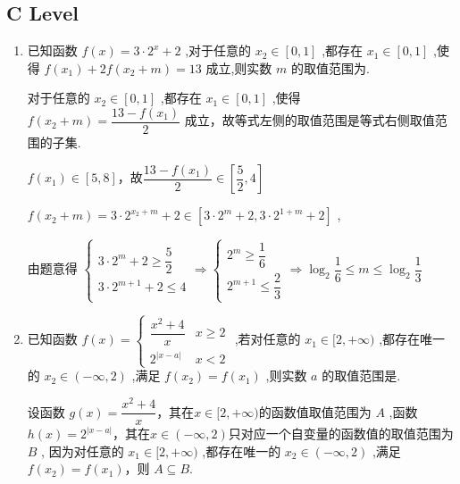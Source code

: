 \subsection*{C Level}
\begin{enumerate}
    \item 已知函数 $f\left( x\right)  = 3 \cdot  {2}^{x} + 2$ ,对于任意的 ${x}_{2} \in  \left\lbrack  {0,1}\right\rbrack$ ,都存在 ${x}_{1} \in  \left\lbrack  {0,1}\right\rbrack$ ,使得 $f\left( {x}_{1}\right)  + {2f}\left( {{x}_{2} + m}\right)  = {13}$ 成立,则实数 $m$ 的取值范围为.
    \begin{jieda}
        对于任意的 ${x}_{2} \in  \left\lbrack  {0,1}\right\rbrack$ ,都存在 ${x}_{1} \in  \left\lbrack  {0,1}\right\rbrack$ ,使得 ${f}\left( {{x}_{2} + m}\right)  = \dfrac{{13} - f\left( {x}_{1}\right) }{2}$ 成立，故等式左侧的取值范围是等式右侧取值范围的子集.
        
        $f\left( {x}_{1}\right)  \in  \left\lbrack  {5,8}\right\rbrack  $，故$\dfrac{{13} - f\left( {x}_{1}\right) }{2} \in  \left\lbrack  {\dfrac{5}{2},4}\right\rbrack$
        
        $f\left( {{x}_{2} + m}\right)  = 3 \cdot  {2}^{{x}_{2} + m} + 2 \in  \left\lbrack  {3 \cdot  {2}^{m} + 2,3 \cdot  {2}^{1 + m} + 2}\right\rbrack$ ,
        
        由题意得 $\left\{  {\begin{array}{l} 3 \cdot  {2}^{m} + 2 \geq  \dfrac{5}{2} \\  3 \cdot  {2}^{m + 1} + 2 \leq  4 \end{array} \Longrightarrow  \left\{  {\begin{array}{l} {2}^{m} \geq  \dfrac{1}{6} \\  {2}^{m + 1} \leq  \dfrac{2}{3} \end{array} \Longrightarrow  {\log }_{2}\dfrac{1}{6} \leq  m \leq  {\log }_{2}\dfrac{1}{3}}\right. }\right.$
    \end{jieda}
    \item 已知函数 $f\left( x\right)  = \left\{  \begin{array}{ll} \dfrac{{x}^{2} + 4}{x} & x \geq  2 \\  {2}^{\left| x - a\right| } & x < 2 \end{array}\right.$ ,若对任意的 ${x}_{1} \in  \lbrack 2, + \infty )$ ,都存在唯一的 ${x}_{2} \in  \left( {-\infty ,2}\right)$ ,满足 $f\left( {x}_{2}\right)  = f\left( {x}_{1}\right)$ ,则实数 $a$ 的取值范围是.
    \begin{jieda}
        设函数 $g\left( x\right)  = \dfrac{{x}^{2} + 4}{x}$，其在$x \in [2, +\infty)$的函数值取值范围为 ${A}$ ,函数 $h\left( x\right)  = {2}^{\left| x - a\right| }$，其在$x \in (-\infty, 2)$只对应一个自变量的函数值的取值范围为 $B$ , 因为对任意的 ${x}_{1} \in  \lbrack 2, + \infty )$ ,都存在唯一的 ${x}_{2} \in  \left( {-\infty ,2}\right)$ ,满足 $f\left( {x}_{2}\right)  = f\left( {x}_{1}\right)$，则 $A \subseteq  B$.
        

\end{jieda}
\end{enumerate}
